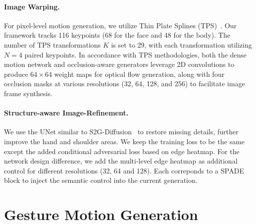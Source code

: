\paragraph{Image Warping.}
For pixel-level motion generation, we utilize Thin Plate Splines (TPS)~\cite{zhao2022thin}. Our framework tracks 116 keypoints (68 for the face and 48 for the body). The number of TPS transformations \(K\) is set to 29, with each transformation utilizing \(N = 4\) paired keypoints. In accordance with TPS methodologies, both the dense motion network and occlusion-aware generators leverage 2D convolutions to produce \(64 \times 64\) weight maps for optical flow generation, along with four occlusion masks at various resolutions (32, 64, 128, and 256) to facilitate image frame synthesis.

\paragraph{Structure-aware Image-Refinement.} We use the UNet similar to S2G-Diffusion~\cite{s2gdiffusion} to restore missing details, further improve the hand and shoulder areas. We keep the training loss to be the same except the added conditional adversarial loss based on edge heatmap. For the network design difference, we add the multi-level edge heatmap as additional control for different resolutions (32, 64 and 128). Each correponds to a SPADE~\cite{park2019SPADE} block to inject the semantic control into the current generation.




\section{Gesture Motion Generation}
\label{sec:s2g-generation}
\vspace{-0.2cm}
